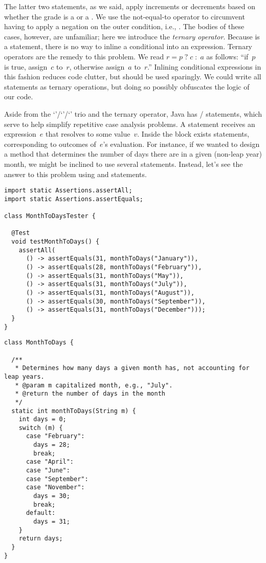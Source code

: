 The latter two  statements, as we said, apply increments or decrements based on whether the grade is a \ttt{+} or a \ttt{-}.
We use the not-equal-to operator \ttt{!=} to circumvent having to apply a negation on the outer condition, i.e., . 
The bodies of these cases, however, are unfamiliar; here we introduce the \emph{ternary operator}. 
Because  is a statement, there is no way to inline a conditional into an expression. 
Ternary operators are the remedy to this problem. 
We read ${r = p\;?\;c\;:\;a}$ as follows: ``if~$p$ is true, assign~$c$ to~$r$, otherwise assign~$a$ to~$r$.'' 
Inlining conditional expressions in this fashion reduces code clutter, but should be used sparingly. We could write all  statements as ternary operations, but doing so possibly obfuscates the logic of our code.

Aside from the `'/`'/`' trio and the ternary operator, Java has / statements, which serve to help simplify repetitive case analysis problems. 
A  statement receives an expression~$e$ that resolves to some value~$v$. 
Inside the  block exists  statements, corresponding to outcomes of~$e$'s evaluation. 
For instance, if we wanted to design a method that determines the number of days there are in a given (non-leap year) month, we might be inclined to use several  statements. Instead, let's see the answer to this problem using  and  statements.

\begin{lstlisting}[language=MyJava]
import static Assertions.assertAll;
import static Assertions.assertEquals;

class MonthToDaysTester {

  @Test
  void testMonthToDays() {
    assertAll(
      () -> assertEquals(31, monthToDays("January")),
      () -> assertEquals(28, monthToDays("February")),
      () -> assertEquals(31, monthToDays("May")),
      () -> assertEquals(31, monthToDays("July")),
      () -> assertEquals(31, monthToDays("August")),
      () -> assertEquals(30, monthToDays("September")),
      () -> assertEquals(31, monthToDays("December")));
  }
}
\end{lstlisting}

\begin{lstlisting}[language=MyJava]
class MonthToDays {

  /**
   * Determines how many days a given month has, not accounting for leap years.
   * @param m capitalized month, e.g., "July".
   * @return the number of days in the month
   */
  static int monthToDays(String m) {
    int days = 0;
    switch (m) {
      case "February":
        days = 28;
        break;
      case "April":
      case "June":
      case "September":
      case "November":
        days = 30;
        break;
      default:
        days = 31;
    }
    return days;
  }
}
\end{lstlisting}

